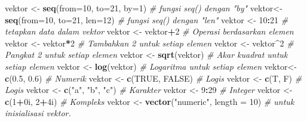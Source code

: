\documentclass[
]{book}
\newenvironment{Shaded}{\begin{snugshade}}{\end{snugshade}}
\newcommand{\AttributeTok}[1]{\textcolor[rgb]{0.13,0.29,0.53}{#1}}
\newcommand{\CommentTok}[1]{\textcolor[rgb]{0.56,0.35,0.01}{\textit{#1}}}
\newcommand{\ConstantTok}[1]{\textcolor[rgb]{0.56,0.35,0.01}{#1}}
\newcommand{\DecValTok}[1]{\textcolor[rgb]{0.00,0.00,0.81}{#1}}
\newcommand{\FloatTok}[1]{\textcolor[rgb]{0.00,0.00,0.81}{#1}}
\newcommand{\FunctionTok}[1]{\textcolor[rgb]{0.13,0.29,0.53}{\textbf{#1}}}
\newcommand{\NormalTok}[1]{#1}
\newcommand{\OtherTok}[1]{\textcolor[rgb]{0.56,0.35,0.01}{#1}}
\newcommand{\SpecialCharTok}[1]{\textcolor[rgb]{0.81,0.36,0.00}{\textbf{#1}}}
\newcommand{\StringTok}[1]{\textcolor[rgb]{0.31,0.60,0.02}{#1}}
\begin{document}
\begin{Shaded}
\begin{Highlighting}[]
\NormalTok{vektor }\OtherTok{\textless{}{-}} \FunctionTok{seq}\NormalTok{(}\AttributeTok{from=}\DecValTok{10}\NormalTok{, }\AttributeTok{to=}\DecValTok{21}\NormalTok{, }\AttributeTok{by=}\DecValTok{1}\NormalTok{)      }\CommentTok{\# fungsi \textasciigrave{}seq()\textasciigrave{} dengan "by"}
\NormalTok{vektor}\OtherTok{\textless{}{-}} \FunctionTok{seq}\NormalTok{(}\AttributeTok{from=}\DecValTok{10}\NormalTok{, }\AttributeTok{to=}\DecValTok{21}\NormalTok{, }\AttributeTok{len=}\DecValTok{12}\NormalTok{)     }\CommentTok{\# fungsi \textasciigrave{}seq()\textasciigrave{} dengan "len"}
\NormalTok{vektor }\OtherTok{\textless{}{-}} \DecValTok{10}\SpecialCharTok{:}\DecValTok{21}                          \CommentTok{\# tetapkan data dalam vektor }
\NormalTok{vektor }\OtherTok{\textless{}{-}}\NormalTok{ vektor}\SpecialCharTok{+}\DecValTok{2}                       \CommentTok{\# Operasi berdasarkan elemen}
\NormalTok{vektor }\OtherTok{\textless{}{-}}\NormalTok{ vektor}\SpecialCharTok{*}\DecValTok{2}                       \CommentTok{\# Tambahkan 2 untuk setiap elemen }
\NormalTok{vektor }\OtherTok{\textless{}{-}}\NormalTok{ vektor}\SpecialCharTok{\^{}}\DecValTok{2}                       \CommentTok{\# Pangkat 2 untuk setiap elemen }
\NormalTok{vektor }\OtherTok{\textless{}{-}} \FunctionTok{sqrt}\NormalTok{(vektor)                   }\CommentTok{\# Akar kuadrat untuk setiap elemen}
\NormalTok{vektor }\OtherTok{\textless{}{-}} \FunctionTok{log}\NormalTok{(vektor)                    }\CommentTok{\# Logaritma untuk setiap elemen}
\NormalTok{vektor}\OtherTok{\textless{}{-}} \FunctionTok{c}\NormalTok{(}\FloatTok{0.5}\NormalTok{, }\FloatTok{0.6}\NormalTok{)                     }\CommentTok{\# Numerik}
\NormalTok{vektor }\OtherTok{\textless{}{-}} \FunctionTok{c}\NormalTok{(}\ConstantTok{TRUE}\NormalTok{, }\ConstantTok{FALSE}\NormalTok{)                 }\CommentTok{\# Logis}
\NormalTok{vektor }\OtherTok{\textless{}{-}} \FunctionTok{c}\NormalTok{(T, F)                        }\CommentTok{\# Logis}
\NormalTok{vektor }\OtherTok{\textless{}{-}} \FunctionTok{c}\NormalTok{(}\StringTok{"a"}\NormalTok{, }\StringTok{"b"}\NormalTok{, }\StringTok{"c"}\NormalTok{)               }\CommentTok{\# Karakter}
\NormalTok{vektor }\OtherTok{\textless{}{-}} \DecValTok{9}\SpecialCharTok{:}\DecValTok{29}                           \CommentTok{\# Integer}
\NormalTok{vektor }\OtherTok{\textless{}{-}} \FunctionTok{c}\NormalTok{(}\DecValTok{1}\SpecialCharTok{+}\NormalTok{0i, }\DecValTok{2}\SpecialCharTok{+}\NormalTok{4i)                  }\CommentTok{\# Kompleks}
\NormalTok{vektor }\OtherTok{\textless{}{-}} \FunctionTok{vector}\NormalTok{(}\StringTok{"numeric"}\NormalTok{, }\AttributeTok{length =} \DecValTok{10}\NormalTok{) }\CommentTok{\# untuk inisialisasi vektor.}
\end{Highlighting}
\end{Shaded}
\end{document}

